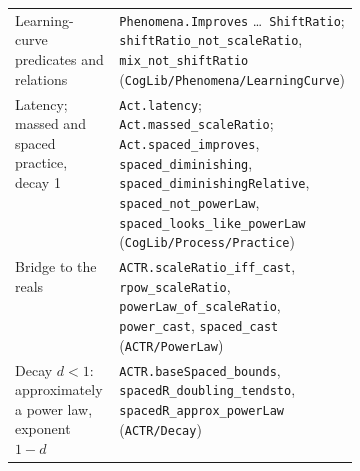 \documentclass[11pt]{article}
\newcommand{\code}[1]{\texttt{#1}}
\newcommand{\lean}[1]{\texttt{#1}}
\begin{document}
\begin{table}[h]
\begin{tabularx}{\linewidth}{@{}>{\raggedright\arraybackslash}p{0.4\linewidth}>{\raggedright\arraybackslash}X@{}}
Learning-curve predicates and relations & \lean{Phenomena.Improves} \dots\ \lean{ShiftRatio}; \lean{shiftRatio\_not\_scaleRatio}, \lean{mix\_not\_shiftRatio} (\code{CogLib/Phenomena/LearningCurve}) \\
Latency; massed and spaced practice, decay 1 & \lean{Act.latency}; \lean{Act.massed\_scaleRatio}; \lean{Act.spaced\_improves}, \lean{spaced\_diminishing}, \lean{spaced\_diminishingRelative}, \lean{spaced\_not\_powerLaw}, \lean{spaced\_looks\_like\_powerLaw} (\code{CogLib/Process/Practice}) \\
Bridge to the reals & \lean{ACTR.scaleRatio\_iff\_cast}, \lean{rpow\_scaleRatio}, \lean{powerLaw\_of\_scaleRatio}, \lean{power\_cast}, \lean{spaced\_cast} (\code{ACTR/PowerLaw}) \\
Decay $d<1$: approximately a power law, exponent $1-d$ & \lean{ACTR.baseSpaced\_bounds}, \lean{spacedR\_doubling\_tendsto}, \lean{spacedR\_approx\_powerLaw} (\code{ACTR/Decay}) \\
\bottomrule
\end{tabularx}
\end{table}
\end{document}
